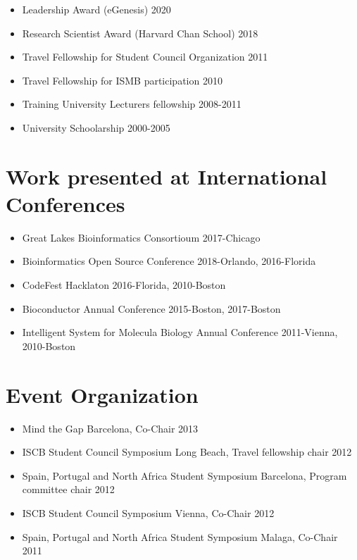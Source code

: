 \begin{itemize}
\tightlist
\item Leadership Award (eGenesis) \hfill 2020
\item Research Scientist Award (Harvard Chan School) \hfill 2018
\item
  Travel Fellowship for Student Council Organization \hfill 2011
\item
  Travel Fellowship for ISMB participation \hfill 2010
\item
  Training University Lecturers fellowship \hfill 2008-2011
\item
  University Schoolarship \hfill 2000-2005
\end{itemize}


\hypertarget{work-presented-at-international-conferences}{%
\section{Work presented at International
Conferences}\label{work-presented-at-international-conferences}}

\begin{itemize}
\tightlist
\item
  Great Lakes Bioinformatics Consortioum \hfill 2017-Chicago
\item
  Bioinformatics Open Source Conference \hfill 2018-Orlando, 2016-Florida
\item
  CodeFest Hacklaton \hfill 2016-Florida, 2010-Boston
\item
  Bioconductor Annual Conference \hfill 2015-Boston, 2017-Boston
\item
  Intelligent System for Molecula Biology Annual Conference \hfill 2011-Vienna, 2010-Boston
\end{itemize}


\hypertarget{event-organization}{%
\section{Event Organization}\label{event-organization}}

\begin{itemize}
\tightlist
\item
  Mind the Gap Barcelona, Co-Chair \hfill 2013
\item
  ISCB Student Council Symposium Long Beach, Travel fellowship chair  \hfill 2012
\item
  Spain, Portugal and North Africa Student Symposium Barcelona, Program committee chair \hfill 2012

\item
  ISCB Student Council Symposium Vienna, Co-Chair \hfill 2012
\item
  Spain, Portugal and North Africa Student Symposium Malaga, Co-Chair \hfill 2011
\end{itemize}


